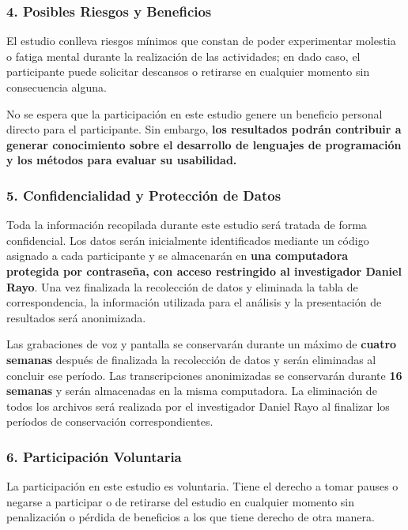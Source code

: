 \subsubsection{4. Posibles Riesgos y Beneficios}

El estudio conlleva riesgos mínimos que constan de poder experimentar molestia o fatiga mental durante la realización de las actividades; en dado caso, el participante puede solicitar descansos o retirarse en cualquier momento sin consecuencia alguna.

No se espera que la participación en este estudio genere un beneficio personal directo para el participante. Sin embargo, \textbf{los resultados podrán contribuir a generar conocimiento sobre el desarrollo de lenguajes de programación y los métodos para evaluar su usabilidad.}

\subsubsection{5. Confidencialidad y Protección de Datos}

Toda la información recopilada durante este estudio será tratada de forma confidencial. Los datos serán inicialmente identificados mediante un código asignado a cada participante y se almacenarán en \textbf{una computadora protegida por contraseña, con acceso restringido al investigador Daniel Rayo}. Una vez finalizada la recolección de datos y eliminada la tabla de correspondencia, la información utilizada para el análisis y la presentación de resultados será anonimizada.

Las grabaciones de voz y pantalla se conservarán durante un máximo de \textbf{cuatro semanas} después de finalizada la recolección de datos y serán eliminadas al concluir ese período. Las transcripciones anonimizadas se conservarán durante \textbf{16 semanas} y serán almacenadas en la misma computadora. La eliminación de todos los archivos será realizada por el investigador Daniel Rayo al finalizar los períodos de conservación correspondientes.

\subsubsection{6. Participación Voluntaria}

La participación en este estudio es voluntaria. Tiene el derecho a tomar pauses o negarse a participar o de
retirarse del estudio en cualquier momento sin penalización o pérdida de beneficios a los que
tiene derecho de otra manera.

